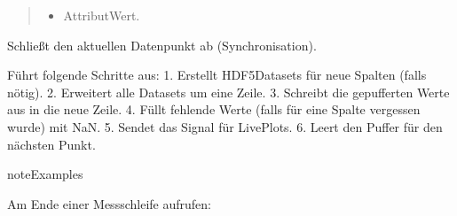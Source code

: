 \documentclass[letterpaper,10pt,english]{sphinxmanual}
\begin{document}
\begin{fulllineitems}
\begin{fulllineitems}
\begin{quote}
\begin{description}
\begin{itemize}
\item {} 
\sphinxAtStartPar
{} \textendash{} Attribut\sphinxhyphen{}Wert.

\end{itemize}

\end{description}\end{quote}

\end{fulllineitems}


\begin{fulllineitems}
\label{\detokenize{modulab/export_manager:modules.export.ExportManager.ExportManager.commit}}
\pysigstartsignatures
\pysiglinewithargsret
{}
{}
{}
\pysigstopsignatures
\sphinxAtStartPar
Schließt den aktuellen Datenpunkt ab (Synchronisation).

\sphinxAtStartPar
Führt folgende Schritte aus:
1. Erstellt HDF5\sphinxhyphen{}Datasets für neue Spalten (falls nötig).
2. Erweitert alle Datasets um eine Zeile.
3. Schreibt die gepufferten Werte aus  in die neue Zeile.
4. Füllt fehlende Werte (falls  für eine Spalte vergessen wurde) mit NaN.
5. Sendet das \sphinxhyphen{}Signal für Live\sphinxhyphen{}Plots.
6. Leert den Puffer für den nächsten Punkt.

\begin{sphinxadmonition}{note}{Examples}

\sphinxAtStartPar
Am Ende einer Messschleife aufrufen:

\begin{sphinxVerbatim}[commandchars=\\\{\}]
 
      
     
     
\end{sphinxVerbatim}
\end{sphinxadmonition}

\end{fulllineitems}


\end{fulllineitems}
\end{document}
